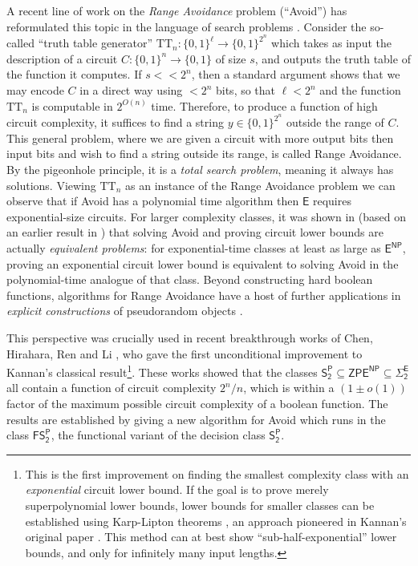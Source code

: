 \documentclass[11pt]{article}
\newcommand{\todo}[1]{\textcolor{red}{TODO: #1}}
\newcommand{\B}{\{0,1\}}
\begin{document}
A recent line of work on the \emph{Range Avoidance} problem (``Avoid'') has reformulated this topic in the language of search problems \cite{Korten,CHR}. Consider the so-called ``truth table generator'' $\mathrm{TT}_n: \B^{\ell} \to \B^{2^n}$ which takes as input the description of a circuit $C: \B^n \to \B$ of size $s$, and outputs the truth table of the function it computes. If $s << 2^n$, then a standard argument shows that we may encode $C$ in a direct way using $< 2^n$ bits, so that $\ell < 2^n$ and the function $\mathrm{TT}_n$ is computable in $2^{O(n)}$ time. Therefore, to produce a function of high circuit complexity, it suffices to find a string $y \in \B^{2^n}$ outside the range of $C$. This general problem, where we are given a circuit with more output bits then input bits and wish to find a string outside its range, is called Range Avoidance. By the pigeonhole principle, it is a \emph{total search problem}, meaning it always has solutions.
Viewing $\mathrm{TT}_n$ as an instance of the Range Avoidance problem we can observe that if Avoid has a polynomial time algorithm then $\mathsf{E}$ requires exponential-size circuits. For larger complexity classes, it was shown in \cite{Korten} (based on an earlier result in \cite{Jerabek}) that solving Avoid and proving circuit lower bounds are actually \emph{equivalent problems}: for exponential-time classes at least as large as $\mathsf{E^{NP}}$, proving an exponential circuit lower bound is equivalent to solving Avoid in the polynomial-time analogue of that class. Beyond constructing hard boolean functions, algorithms for Range Avoidance have a host of further applications in \emph{explicit constructions} of pseudorandom objects \cite{Korten,low-depth-avoid}.

This perspective was crucially used in recent breakthrough works of Chen, Hirahara, Ren and Li \cite{CHR,Li}, who gave the first unconditional improvement to Kannan's classical result\footnote{This is the first improvement on finding the smallest complexity class with an \emph{exponential} circuit lower bound. If the goal is to prove merely superpolynomial lower bounds, lower bounds for smaller classes can be established using Karp-Lipton theorems \cite{karp-lipton}, an approach pioneered in Kannan's original paper \cite{Kannan}. This method can at best show ``sub-half-exponential'' lower bounds, and only for infinitely many input lengths.}. These works showed that the classes $\mathsf{S_2^P}\subseteq \mathsf{ZPE^{NP}} \subseteq\mathsf{\Sigma_2^E} $ all contain a function of circuit complexity $2^n/n$, which is within a $(1 \pm o(1))$ factor of the maximum possible circuit complexity of a boolean function. The results are established by giving a new algorithm for Avoid which runs in the class $\mathsf{FS_2^P}$, the functional variant of the decision class $\mathsf{S_2^P}$. 
\end{document}
